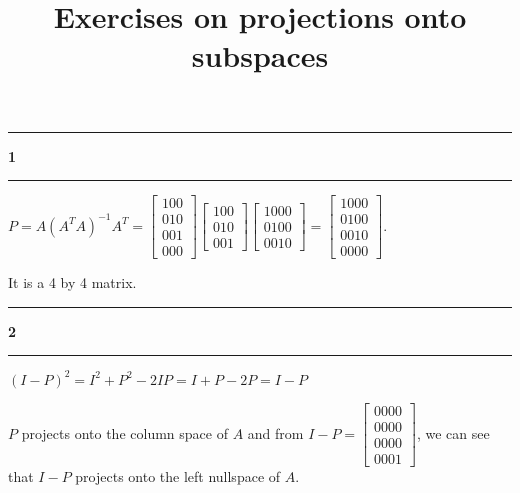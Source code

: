 \documentclass[11pt]{article}
\newcommand\question[2]{\vspace{.25in}\hrule\textbf{#1 #2}\vspace{.5em}\hrule\vspace{.10in}}
\begin{document}
\raggedright
\newcommand\NAME{Haiying Cui}  %
\newcommand\ANDREWID{Christy}     %
\newcommand\HWNUM{15}              %

\title{Exercises on projections onto subspaces}
\maketitle

\question{1}{}
\(P = A(A^TA)^{-1}A^T = \begin{bmatrix} 1 0 0 \\ 0 1 0 \\ 0 0 1 \\ 0 0 0 \end{bmatrix}\begin{bmatrix}1 0 0 \\ 0 1 0 \\ 0 0 1 \end{bmatrix}\begin{bmatrix}1 0 0 0 \\ 0 1 0 0 \\ 0 0 1 0 \end{bmatrix} = \begin{bmatrix}1 0 0 0 \\ 0 1 0 0 \\ 0 0 1 0 \\ 0 0 0 0 \end{bmatrix}\).

It is a 4 by 4 matrix.

\question{2}{}
\((I - P)^2 = I^2 + P^2 - 2IP = I + P - 2P = I - P\)

\(P\) projects onto the column space of \(A\) and from \(I - P = \begin{bmatrix} 0 0 0 0 \\ 0 0 0 0 \\ 0 0 0 0 \\ 0 0 0 1 \end{bmatrix}\), we can see that \(I - P\) projects onto the left nullspace of \(A\).
\end{document}
